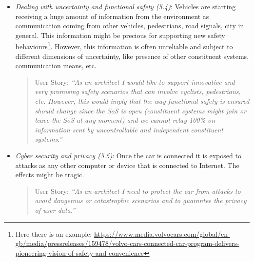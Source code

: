 \begin{itemize}
\begin{itemize}
\begin{quote}
{User Story:} 
\emph{``As an architect I need to manage the transition towards autonomous behaviours of the car that are needed to achieve the goal of the SoS. The car should be engineered so to, often immediately, switch to another mode and perform the actions required by the SoS. The right tradeoff between independence of the vehicle (from the SoS) and service offered to the SoS needs to be found.''}
\end{quote}

\item {\em Dealing with uncertainty and functional safety (5.4)}: Vehicles are starting receiving a huge amount of information from the environment as communication coming from other vehicles, pedestrians, road signals, city in general. This information might be precious for supporting new safety behaviours\footnote{Here there is an example: \url{https://www.media.volvocars.com/global/en-gb/media/pressreleases/159478/volvo-cars-connected-car-program-delivers-pioneering-vision-of-safety-and-convenience}}. However, this information is often unreliable and subject to different dimensions of uncertainty, like presence of other constituent systems, communication means, etc.

\begin{quote}
{User Story:} 
\emph{``As an architect I would like to support innovative and very promising safety scenarios that can involve cyclists, pedestrians, etc. However, this would imply that the way functional safety is ensured should change since the SoS is open (constituent systems might join or leave the SoS at any moment) and we cannot relay 100\% on information sent by uncontrollable and independent constituent systems.''}
\end{quote}


\item {\em Cyber security and privacy (5.5)}: Once the car is connected it is exposed to attacks as any other computer or device that is connected to Internet. The effects might be tragic.

\begin{quote}
{User Story:} 
\emph{``As an architect I need to protect the car from attacks to avoid dangerous or catastrophic scenarios and to guarantee the privacy of user data.''}
\end{quote}


\end{itemize}



\end{itemize}
